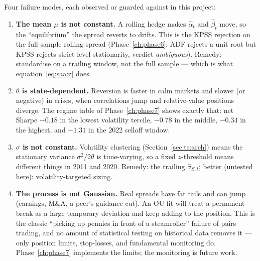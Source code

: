 Four failure modes, each observed or guarded against in this project:
\begin{enumerate}
  \item \textbf{The mean $\mu$ is not constant.} A rolling hedge makes $\hat\alpha_t$ and
    $\hat\beta_t$ move, so the ``equilibrium'' the spread reverts to drifts. This is the
    KPSS rejection on the full-sample rolling spread (Phase~\ref{ch:phase6}: ADF rejects
    a unit root but KPSS rejects strict level-stationarity, verdict \emph{ambiguous}).
    Remedy: standardise on a trailing window, not the full sample --- which is what
    equation~\eqref{eq:saa:z} does.
  \item \textbf{$\theta$ is state-dependent.} Reversion is faster in calm markets and
    slower (or negative) in crises, when correlations jump and relative-value positions
    diverge. The regime table of Phase~\ref{ch:phase7} shows exactly that: net Sharpe
    $-0.18$ in the lowest volatility tercile, $-0.78$ in the middle, $-0.34$ in the
    highest, and $-1.31$ in the 2022 selloff window.
  \item \textbf{$\sigma$ is not constant.} Volatility clustering
    (Section~\ref{sec:ts:arch}) means the stationary variance $\sigma^2/2\theta$ is
    time-varying, so a fixed $z$-threshold means different things in 2011 and 2020.
    Remedy: the trailing $\hat\sigma_{S,t}$; better (untested here): volatility-targeted
    sizing.
  \item \textbf{The process is not Gaussian.} Real spreads have fat tails and can jump
    (earnings, M\&A, a peer's guidance cut). An OU fit will treat a permanent break as a
    large temporary deviation and keep adding to the position. This is the classic
    ``picking up pennies in front of a steamroller'' failure of pairs trading, and no
    amount of statistical testing on historical data removes it --- only position limits,
    stop-losses, and fundamental monitoring do. Phase~\ref{ch:phase7} implements the
    limits; the monitoring is future work.
\end{enumerate}
